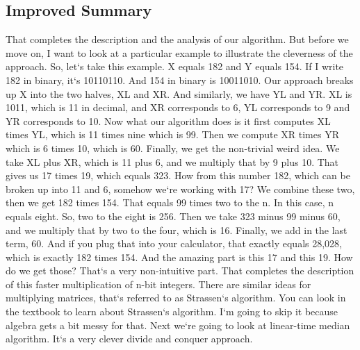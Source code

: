 \subsection{Improved  Summary}
That completes the description and the analysis of our algorithm.
But before we move on, I want to look at a particular example to illustrate the cleverness of the approach.
So, let`s take this example.
X equals 182 and Y equals 154.
If I write 182 in binary, it`s 10110110.
And 154 in binary is 10011010.
Our approach breaks up X into the two halves, XL and XR\@.
And similarly, we have YL and YR\@.
XL is 1011, which is 11 in decimal, and XR corresponds to 6, YL corresponds to 9 and YR corresponds to 10.
Now what our algorithm does is it first computes XL times YL, which is 11 times nine which is 99.
Then we compute XR times YR which is 6 times 10, which is 60.
Finally, we get the non-trivial weird idea.
We take XL plus XR, which is 11 plus 6, and we multiply that by 9 plus 10.
That gives us 17 times 19, which equals 323.
How from this number 182, which can be broken up into 11 and 6, somehow we`re working with 17? We combine these two, then we get 182 times 154.
That equals 99 times two to the n.
In this case, n equals eight.
So, two to the eight is 256.
Then we take 323 minus 99 minus 60, and we multiply that by two to the four, which is 16.
Finally, we add in the last term, 60.
And if you plug that into your calculator, that exactly equals 28,028, which is exactly 182 times 154.
And the amazing part is this 17 and this 19.
How do we get those? That`s a very non-intuitive part.
That completes the description of this faster multiplication of n-bit integers.
There are similar ideas for multiplying matrices, that`s referred to as Strassen`s algorithm.
You can look in the textbook to learn about Strassen`s algorithm.
I`m going to skip it because algebra gets a bit messy for that.
Next we`re going to look at linear-time median algorithm.
It`s a very clever divide and conquer approach.


